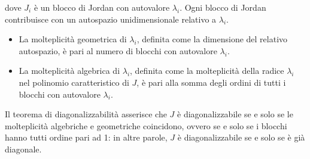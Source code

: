 dove $J_i$ \`e un blocco di Jordan con autovalore $\lambda_i$. Ogni
blocco di Jordan contribuisce con un autospazio unidimensionale
relativo a $\lambda_i$.\\
\begin{itemize}
\item La molteplicit\`a geometrica di $\lambda_i$, definita come la
  dimensione del relativo autospazio, \`e pari al numero di blocchi con
  autovalore $\lambda_i$.
\item La molteplicit\`a algebrica di $\lambda_i$, definita come la
  molteplicit\`a della radice $\lambda_i$ nel polinomio caratteristico di
  $J$, \`e pari alla somma degli ordini di tutti i blocchi con autovalore
$\lambda_i$.
\end{itemize}
Il teorema di diagonalizzabilit\`a asserisce che $J$ \`e diagonalizzabile
se e solo se le molteplicit\`a algebriche e geometriche coincidono,
ovvero se e solo se i blocchi hanno tutti ordine pari ad 1: in altre
parole, $J$ \`e diagonalizzabile se e solo se \`e gi\`a diagonale.


